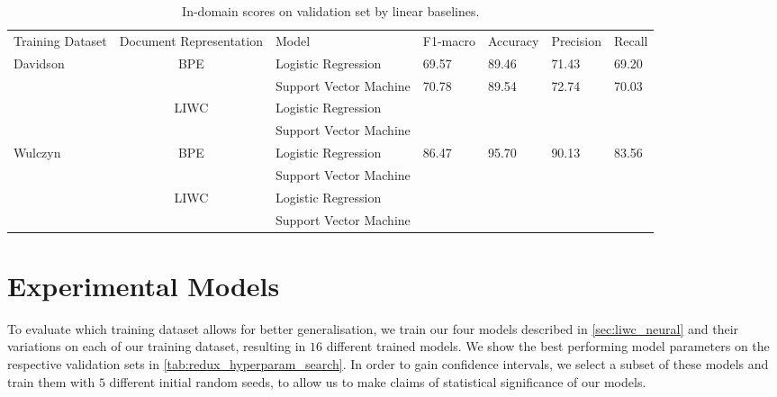 \begin{landscape}
\begin{table}[]
\centering
\begin{tabular}{lclllll}
Training Dataset          & \multicolumn{1}{l}{Document Representation} & Model                   & F1-macro & Accuracy & Precision & Recall \\
\multirow{4}{*}{Davidson} & \multirow{2}{*}{BPE}                        & Logistic Regression     & 69.57    & 89.46    & 71.43     & 69.20  \\
                          &                                             & Support Vector Machine  & 70.78    & 89.54    & 72.74     & 70.03  \\
                          & \multirow{2}{*}{LIWC}                       & Logistic Regression     &          &          &           &        \\
                          &                                             & Support Vector Machine  &          &          &           &        \\
\multirow{4}{*}{Wulczyn}  & \multirow{2}{*}{BPE}                        & Logistic Regression     & 86.47    & 95.70    & 90.13     & 83.56  \\
                          &                                             & Support Vector Machine  &          &          &           &        \\
                          & \multirow{2}{*}{LIWC}                       & Logistic Regression     &          &          &           &        \\
                          &                                             & Support Vector Machine  &          &          &           &
\end{tabular}
\caption{In-domain scores on validation set by linear baselines.}
\label{tab:redux_linear_baselines_dev}
\end{table}
\end{landscape}

\section{Experimental Models}

To evaluate which training dataset allows for better generalisation, we train our four models described in \autoref{sec:liwc_neural} and their variations on each of our training dataset, resulting in $16$ different trained models. We show the best performing model parameters on the respective validation sets in \autoref{tab:redux_hyperparam_search}. In order to gain confidence intervals, we select a subset of these models and train them with $5$ different initial random seeds, to allow us to make claims of statistical significance of our models.

